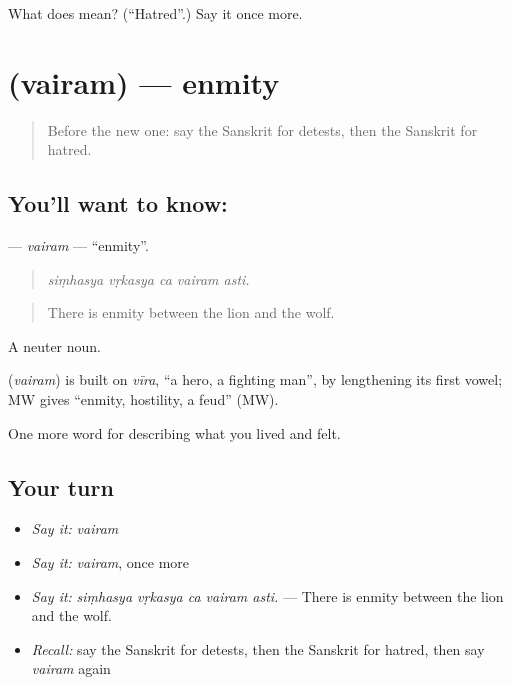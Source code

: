 \begin{tcolorbox}[breakable,colback=teal!4,colframe=teal!35!black,title={Before you move on}]
What does  mean? (\textquotedblleft{}Hatred\textquotedblright{}.) Say it once more.
\end{tcolorbox}
\section[\texorpdfstring{\sk{वैरम्} (vairam)}{वैरम् (vairam)}]{ (vairam) — enmity}

\label{lesson:SA-C454-vairam}



\begin{quote}
Before the new one: say the Sanskrit for detests, then the Sanskrit for hatred.
\end{quote}

\subsection*{You'll want to know: }
\textbf{} — \emph{vairam} — \textquotedblleft{}enmity\textquotedblright{}.

\begin{quote}
    
\end{quote}

\begin{quote}
\emph{siṃhasya vṛkasya ca vairam asti.}
\end{quote}

\begin{quote}
There is enmity between the lion and the wolf.
\end{quote}

A neuter noun.

\begin{cousinweb}
\textbf{} (\emph{vairam}) is built on \emph{vīra}, \textquotedblleft{}a hero, a fighting man\textquotedblright{}, by lengthening its first vowel; MW gives \textquotedblleft{}enmity, hostility, a feud\textquotedblright{} (MW).
\end{cousinweb}

\begin{grammarlens}[title={What you've built}]
One more word for describing what you lived and felt.
\end{grammarlens}

\subsection*{Your turn}
\begin{itemize}
\raggedright
  \item \emph{Say it:} \emph{vairam}
  \item \emph{Say it:} \emph{vairam}, once more
  \item \emph{Say it:} \emph{siṃhasya vṛkasya ca vairam asti.} — There is enmity between the lion and the wolf.
  \item \emph{Recall:} say the Sanskrit for detests, then the Sanskrit for hatred, then say \emph{vairam} again
\end{itemize}

